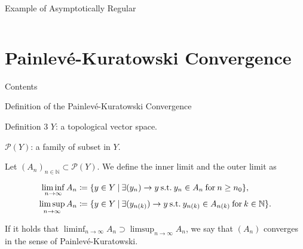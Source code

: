 \documentclass[aspectratio=169, dvipdfmx, 11pt]{beamer} %
\newcommand{\NaturalNumberSet}{\mathbb{N}}
\newcommand{\SuchThat}{\:\text{s.t.}\:}
\newcommand{\Painleve}{Painlev\'e}
\newcommand{\SetForm}[2]{
  \{{#1}\:|\:{#2}\}
}
\begin{document}
\begin{frame}{Example of Asymptotically Regular}
\begin{columns}
\begin{column}{0.48\textwidth}
    \end{column}
  \end{columns}
\end{frame}

\section{\Painleve-Kuratowski Convergence}
\begin{frame}{Contents}
  \tableofcontents[currentsection]
\end{frame}

\begin{frame}{Definition of the \Painleve-Kuratowski Convergence}
  \begin{block}{Definition 3}
    $Y$: a topological vector space.

    $\mathcal{P}(Y)$: a family of subset in $Y$.

    Let $(A_n)_{n \in \NaturalNumberSet} \subset \mathcal{P}(Y)$. We define the inner limit and the outer limit as

    \begin{equation}
      \begin{split}
        \liminf_{n \to \infty}A_n &\coloneqq \SetForm{y \in Y}{\exists (y_n) \to y \SuchThat y_n \in A_n \:\text{for}\: n \geq n_0}, \\
        \limsup_{n \to \infty}A_n &\coloneqq \SetForm{y \in Y}{\exists (y_{n(k)}) \to y \SuchThat y_{n(k)} \in A_{n(k)} \:\text{for}\: k \in \NaturalNumberSet}. \notag
      \end{split}
    \end{equation}

    If it holds that $\liminf_{n \to \infty}A_n \supset \limsup_{n \to \infty}A_n$, we say that $(A_n)$ converges in the sense of \Painleve-Kuratowski.
  \end{block}
\end{frame}
\end{document}
